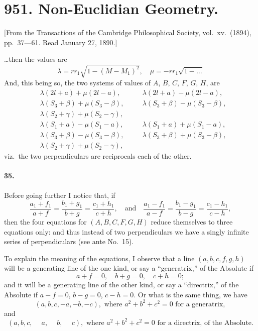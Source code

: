 \documentclass[11pt,a4paper]{book}
\begin{document}
{{{\newpage

\section*{951. Non-Euclidian Geometry.}

[From the Transactions of the Cambridge Philosophical Society, vol.~xv.~(1894), pp.~37---61. Read January 27, 1890.]

\bigskip

\noindent
\ldots then the values are
\[
\lambda = rr_1 \sqrt{1 - (M - M_1)^2}, \quad
\mu = -rr_1 \sqrt{1 - \ldots}
\]
And, this being so, the two systems of values of $A$, $B$, $C$, $F$, $G$, $H$, are
\begin{align*}
&\lambda(2l + a) + \mu(2l - a), \quad &&\lambda(2l + a) - \mu(2l - a), \\
&\lambda (S_3 + \beta) + \mu (S_3 - \beta), \quad &&\lambda (S_3 + \beta) - \mu (S_3 - \beta), \\
&\lambda (S_2 + \gamma) + \mu (S_2 - \gamma), \\
&\lambda(S_1+ a) - \mu(S_1- a), \quad &&\lambda(S_1 + a) + \mu(S_1 - a), \\
&\lambda (S_3 + \beta) - \mu (S_3 - \beta), \quad &&\lambda (S_3 + \beta) + \mu (S_3 - \beta), \\
&\lambda (S_2 + \gamma) + \mu (S_2 - \gamma),
\end{align*}
viz.~the two perpendiculars are reciprocals each of the other.

\paragraph{35.} Before going further I notice that, if
\[
\frac{a_1 + f_1}{a + f} = \frac{b_1 + g_1}{b + g} = \frac{c_1 + h_1}{c + h},
\quad\text{and}\quad
\frac{a_1 - f_1}{a - f} = \frac{b_1 - g_1}{b - g} = \frac{c_1 - h_1}{c - h},
\]
then the four equations for $(A, B, C, F, G, H)$ reduce themselves to three equations
only: and thus instead of two perpendiculars we have a singly infinite series of
perpendiculars (see ante No.~15).

To explain the meaning of the equations, I observe that a line $(a, b, c, f, g, h)$
will be a generating line of the one kind, or say a ``generatrix,'' of the Absolute if
\[
a+f=0, \quad b+g = 0, \quad c + h = 0;
\]
and it will be a generating line of the other kind, or say a ``directrix,'' of the
Absolute if $a-f=0$, $b-g = 0$, $c - h = 0$. Or what is the same thing, we have
\[
(a, b, c, -a, -b, -c), \text{ where } a^2 + b^2 + c^2 = 0 \text{ for a generatrix},
\]
and
\[
(a, b, c, \phantom{-}a, \phantom{-}b, \phantom{-}c), \text{ where } a^2 + b^2 + c^2 = 0 \text{ for a directrix, of the Absolute}.
\]

}}}
\end{document}
